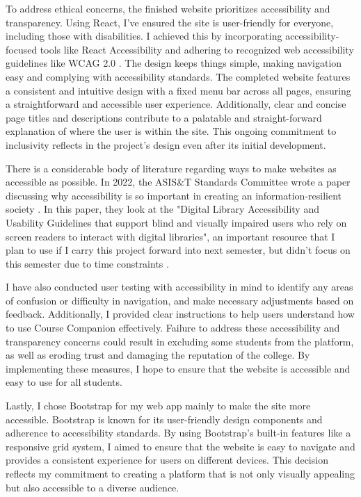 \documentclass[10pt,twocolumn]{article}
\begin{document}
To address ethical concerns, the finished website prioritizes accessibility and transparency. Using React, I've ensured the site is user-friendly for everyone, including those with disabilities. I achieved this by incorporating accessibility-focused tools like React Accessibility and adhering to recognized web accessibility guidelines like WCAG 2.0 \cite{noname08}. The design keeps things simple, making navigation easy and complying with accessibility standards. The completed website features a consistent and intuitive design with a fixed menu bar across all pages, ensuring a straightforward and accessible user experience. Additionally, clear and concise page titles and descriptions contribute to a palatable and straight-forward explanation of where the user is within the site. This ongoing commitment to inclusivity reflects in the project's design even after its initial development. 

There is a considerable body of literature regarding ways to make websites as accessible as possible. In 2022, the ASIS\&T Standards Committee wrote a paper discussing why accessibility is so important in creating an information-resilient society \cite{dickey2022accessibility}. In this paper, they look at the "Digital Library Accessibility and Usability Guidelines that support blind and visually impaired users who rely on screen readers to interact with digital libraries", an important resource that I plan to use if I carry this project forward into next semester, but didn't focus on this semester due to time constraints \cite{dickey2022accessibility}.


I have also conducted user testing with accessibility in mind to identify any areas of confusion or difficulty in navigation, and make necessary adjustments based on feedback. Additionally, I provided clear instructions to help users understand how to use Course Companion effectively. Failure to address these accessibility and transparency concerns could result in excluding some students from the platform, as well as eroding trust and damaging the reputation of the college. By implementing these measures, I hope to ensure that the website is accessible and easy to use for all students.

Lastly, I chose Bootstrap for my web app mainly to make the site more accessible. Bootstrap is known for its user-friendly design components and adherence to accessibility standards. By using Bootstrap's built-in features like a responsive grid system, I aimed to ensure that the website is easy to navigate and provides a consistent experience for users on different devices. This decision reflects my commitment to creating a platform that is not only visually appealing but also accessible to a diverse audience.
\end{document}
